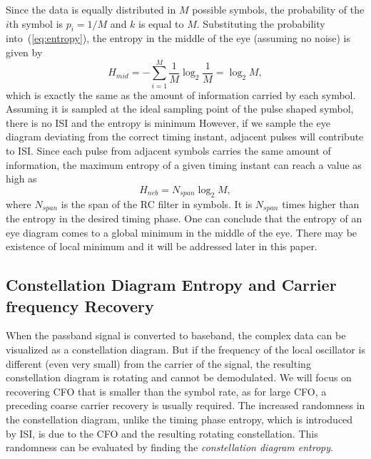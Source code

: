 \documentclass[journal,comsoc]{IEEEtran}
\begin{document}
Since the data is equally distributed in \(M\) possible symbols,
the probability of the $i$th symbol is \(p_i=1/M\) and $k$ is equal to $M$.
Substituting the probability into~(\ref{eq:entropy}), the entropy in the middle of the eye (assuming no noise) is given by
\begin{equation}
H_{mid} =  - \sum\limits_{i = 1}^M {{\frac{1}{M}}\log_2 {\frac{1}{M}}}=\log_2 {M},
\label{eq:entropy_mid}
\end{equation}
which is exactly the same as the amount of information carried by each symbol.
Assuming it is sampled at the ideal sampling point of the pulse shaped symbol, 
there is no ISI and the entropy is minimum
However, if we sample the eye diagram deviating from the correct timing instant, adjacent pulses will contribute to ISI.
Since each pulse from adjacent symbols carries the same amount of information, the maximum entropy of a given timing instant can reach a value as high as
\begin{equation}
H_{neb} =  N_{span}\log_2 {M},
\label{eq:entropy_neb}
\end{equation}
where \(N_{span}\) is the span of the RC filter in symbols.
It is \(N_{span}\) times higher than the entropy in the desired timing phase. 
One can conclude that the entropy of an eye diagram comes to a global minimum in the middle of the eye. 
There may be existence of local minimum and it will be addressed later in this paper.


\subsection{Constellation Diagram Entropy and Carrier frequency Recovery}
\label{sec:const_entp}
When the passband signal is converted to baseband, the complex data can be visualized as a constellation diagram.
But if the frequency of the local oscillator is  different (even very small) from the carrier of the signal, the resulting constellation diagram is rotating and cannot be demodulated.
We will focus on recovering CFO that is smaller than the symbol rate, as for large CFO, a preceding coarse carrier recovery is usually required.
The increased randomness in the constellation diagram, unlike the timing phase entropy, which is introduced by ISI, is due to the CFO and the resulting rotating constellation.
This randomness can be evaluated by finding the \textit{constellation diagram entropy}.
\end{document}
